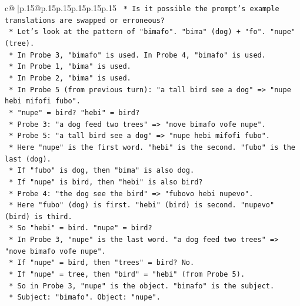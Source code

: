 \documentclass{article}
\begin{document}
{\begin{supertabular}{c@{$\;$}|p{.15\linewidth}@{}p{.15\linewidth}p{.15\linewidth}p{.15\linewidth}p{.15\linewidth}p{.15\linewidth}}
{{{\texttt{                    *   Is it possible the prompt's example translations are swapped or erroneous?} \\
\texttt{                    *   Let's look at the pattern of "bimafo". "bima" (dog) + "fo". "nupe" (tree).} \\
\texttt{                    *   In Probe 3, "bimafo" is used. In Probe 4, "bimafo" is used.} \\
\texttt{                    *   In Probe 1, "bima" is used.} \\
\texttt{                    *   In Probe 2, "bima" is used.} \\
\texttt{                    *   In Probe 5 (from previous turn): "a tall bird see a dog" => "nupe hebi mifofi fubo".} \\
\texttt{                        *   "nupe" = bird? "hebi" = bird?} \\
\texttt{                        *   Probe 3: "a dog feed two trees" => "nove bimafo vofe nupe".} \\
\texttt{                        *   Probe 5: "a tall bird see a dog" => "nupe hebi mifofi fubo".} \\
\texttt{                        *   Here "nupe" is the first word. "hebi" is the second. "fubo" is the last (dog).} \\
\texttt{                        *   If "fubo" is dog, then "bima" is also dog.} \\
\texttt{                        *   If "nupe" is bird, then "hebi" is also bird?} \\
\texttt{                        *   Probe 4: "the dog see the bird" => "fubovo hebi nupevo".} \\
\texttt{                        *   Here "fubo" (dog) is first. "hebi" (bird) is second. "nupevo" (bird) is third.} \\
\texttt{                        *   So "hebi" = bird. "nupe" = bird?} \\
\texttt{                        *   In Probe 3, "nupe" is the last word. "a dog feed two trees" => "nove bimafo vofe nupe".} \\
\texttt{                        *   If "nupe" = bird, then "trees" = bird? No.} \\
\texttt{                        *   If "nupe" = tree, then "bird" = "hebi" (from Probe 5).} \\
\texttt{                        *   So in Probe 3, "nupe" is the object. "bimafo" is the subject.} \\
\texttt{                        *   Subject: "bimafo". Object: "nupe".} \\
}}}
\end{supertabular}}
\end{document}
